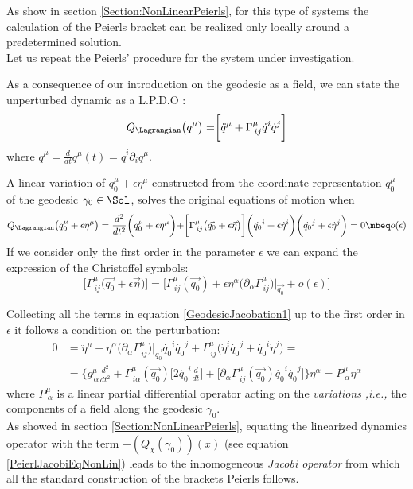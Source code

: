\documentclass[Main]{subfiles}
\begin{document}
	As show in section \ref{Section:NonLinearPeierls}, for this type of systems the calculation of the Peierls bracket can be realized only locally around a predetermined solution.\\
	Let us repeat the Peierls' procedure for the system under investigation.

	As a consequence of our introduction on the geodesic as a field, we can state the unperturbed dynamic as a L.P.D.O :
		\begin{equation}
			Q_\Lagrangian \big(q^\mu 	\big)= \biggr[\ddot{q}^\mu + \Gamma^\mu_{\, i j}\dot{q}^i \dot{q}^j	\biggr]
		\end{equation}
	where $\dot{q}^\mu = \frac{d}{dt}q^\mu(t)=\dot{q}^i\partial_i q^\mu$.
	
	A linear variation of $q_0^\mu +\epsilon \eta^\mu$ constructed from the coordinate representation $q_0^\mu$ of the geodesic $\gamma_0 \in \Sol$, solves the original equations of motion when
	\begin{equation}\label{GeodesicJacobation1}
		Q_\Lagrangian \big( q_0^\mu +\epsilon \eta^\mu \big) = \frac{d^2}{dt^2}\biggr( q_0^\mu +\epsilon \eta^\mu \biggr) +
		\biggr[ \Gamma^\mu_{\, i j}\big( \vec{q_0} + \epsilon \vec{\eta}\big) \biggr]\biggr(\dot{q_0}^i +\epsilon \dot{\eta}^i \biggr)\biggr(\dot{q_0}^j +\epsilon \dot{\eta}^j \biggr) = 0 \mbeq o(\epsilon)
	\end{equation}
	If we consider only the first order in the parameter $\epsilon$ we can expand the expression of the Christoffel symbols:
	\begin{displaymath}
		\biggr[ \Gamma^\mu_{\, i j}\big( \vec{q_0} + \epsilon \vec{\eta}\big) \biggr] =
		\biggr[ \Gamma^\mu_{\, i j}( \vec{q_0}) + \epsilon \eta^\alpha\big( \partial_\alpha  \Gamma^\mu_{\, i j} \big)\biggr\vert_{\vec{q_0}} + o(\epsilon) \biggr]
	\end{displaymath}	 
	
	Collecting all the terms in equation \ref{GeodesicJacobation1} up to the first order in $\epsilon$ it follows a condition on the perturbation:
	\begin{align}\label{Eq:JacobiPeierlsEquation}
	0 &= \ddot{\eta}^\mu + \eta^\alpha\big( \partial_\alpha  \Gamma^\mu_{\, i j} \big)\biggr\vert_{\vec{q_0}} \dot{q_0}^i \dot{q_0}^j  +  \Gamma^\mu_{\, i j} \big(\dot{\eta}^i \dot{q_0}^j + \dot{q_0}^i \dot{\eta}^j \big)= \nonumber \\
	&=\biggr\{ g^\mu_{\,\alpha} \frac{d^2}{dt^2} +
	 \Gamma^\mu_{\, i \alpha}(\vec{q_0})\big[2 \dot{q_0}^i \frac{d}{dt} \big] + 
\big[ \partial_\alpha \Gamma^\mu_{\, i j}(\vec{q_0}) \dot{q_0}^i \dot{q_0}^j  \big] \biggr\} \eta^\alpha	= P^\mu_{\: \alpha} \eta^\alpha
	\end{align}		
	where $ P^\mu_{\: \alpha}$ is a linear partial differential operator acting on the \emph{variations} \textit{,i.e.,} the components of a field along the geodesic $\gamma_0$.\\
	As showed in section \ref{Section:NonLinearPeierls}, equating the linearized dynamics operator with the term $-\left(Q_\chi(\gamma_0)\right)(x)$ 	(see equation \ref{PeierlJacobiEqNonLin}) leads to the inhomogeneous \emph{Jacobi operator} from which all the standard construction of the brackets Peierls follows.
\end{document}

